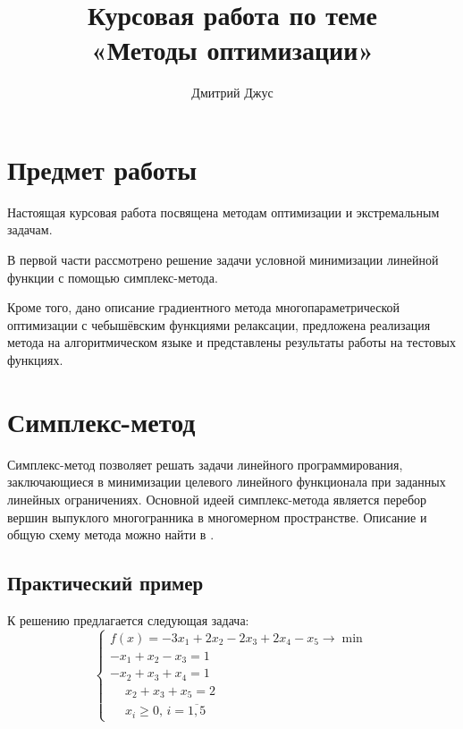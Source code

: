 \documentclass{article}
\renewcommand{\geq}{\geqslant}
\theoremstyle{remark}
\theoremstyle{definition}
\numberwithin{equation}{section}
\begin{document}
\author{Дмитрий Джус}
\title{Курсовая работа по теме \\
  \Huge{«Методы оптимизации»}}
\pretitle{\begin{center}\LARGE}
\posttitle{\par\end{center}\vskip 3pc}
\date{}
\maketitle
\thispagestyle{empty}

\clearpage
\tableofcontents

\clearpage
\section{Предмет работы}

Настоящая курсовая работа посвящена методам оптимизации и
экстремальным задачам.

В первой части рассмотрено решение задачи условной минимизации
линейной функции с помощью симплекс-метода.

Кроме того, дано описание градиентного метода многопараметрической
оптимизации с чебышёвским функциями релаксации, предложена реализация
метода на алгоритмическом языке и представлены результаты работы на
тестовых функциях.

\clearpage
\section{Симплекс-метод}
\label{sec:simplex}

Симплекс-метод позволяет решать задачи линейного программирования,
заключающиеся в минимизации целевого линейного функционала при
заданных линейных ограничениях. Основной идеей симплекс-метода
является перебор вершин выпуклого многогранника в многомерном
пространстве. Описание и общую схему метода можно найти в
\cite{taha05}.

\subsection{Практический пример}

К решению предлагается следующая задача:
\begin{equation}
  \label{eq:lp-initial}
  \begin{cases}
    f(x) = -3x_1+2x_2-2x_3+2x_4-x_5 \to \min \\
    -x_1+x_2-x_3=1 \\
    -x_2+x_3+x_4=1 \\
    \phantom{-}x_2+x_3+x_5=2 \\
    \phantom{-}x_i \geq 0,\, i = \overline{1, 5}
  \end{cases}
\end{equation}
\end{document}
